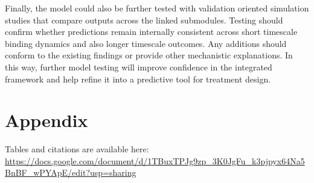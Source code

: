 \documentclass[11pt]{article}
\begin{document}
Finally, the model could also be further tested with validation oriented simulation studies that compare outputs across the linked submodules. Testing should confirm whether predictions remain internally consistent across short timescale binding dynamics and also longer timescale outcomes. Any additions should conform to the existing findings or provide other mechanistic explanations. In this way, further model testing will improve confidence in the integrated framework and help refine it into a predictive tool for treatment design.
\par\medskip

\section{Appendix}

Tables and citations are available here: \url{https://docs.google.com/document/d/1TBuxTPJg9zp_3K0JgFu_k3pjpyx64Na5BnBF_wPYApE/edit?usp=sharing}
\par\medskip
\end{document}

